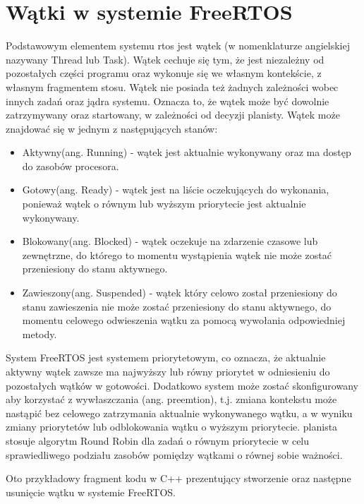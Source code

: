 \section{Wątki w systemie FreeRTOS}
Podstawowym elementem systemu \gls{rtos} jest wątek (w nomenklaturze angielskiej nazywany Thread lub Task).
Wątek cechuje się tym, że jest niezależny od pozostałych części programu oraz wykonuje się we własnym kontekście,
z własnym fragmentem stosu.
Wątek nie posiada też żadnych zależności wobec innych zadań oraz jądra systemu. Oznacza to, że wątek może być dowolnie
zatrzymywany oraz startowany, w zależności od decyzji planisty.
Wątek może znajdować się w jednym z następujących stanów:
\begin{itemize}
      \item Aktywny(ang. Running) - wątek jest aktualnie wykonywany oraz ma dostęp do zasobów procesora.
      \item Gotowy(ang. Ready) - wątek jest na liście oczekujących do wykonania, ponieważ wątek o równym lub wyższym
            priorytecie jest aktualnie wykonywany.
      \item Blokowany(ang. Blocked) - wątek oczekuje na zdarzenie czasowe lub zewnętrzne, do którego to momentu wystąpienia
            wątek nie może zostać przeniesiony do stanu aktywnego.
      \item Zawieszony(ang. Suspended) - wątek który celowo został przeniesiony do stanu zawieszenia nie może zostać przeniesiony
            do stanu aktywnego, do momentu celowego odwieszenia wątku za pomocą wywołania odpowiedniej metody.
\end{itemize}

System FreeRTOS jest systemem priorytetowym, co oznacza, że aktualnie aktywny wątek zawsze ma najwyższy lub równy priorytet
w odniesieniu do pozostałych wątków w gotowości. Dodatkowo system może zostać skonfigurowany
aby korzystać z wywłaszczania (ang. preemtion), t.j. zmiana kontekstu może nastąpić bez celowego zatrzymania aktualnie
wykonywanego wątku, a w wyniku zmiany priorytetów lub odblokowania wątku o wyższym priorytecie. \Gls{planista} stosuje algorytm
Round Robin dla zadań o równym priorytecie w celu sprawiedliwego podziału zasobów pomiędzy wątkami o równej sobie ważności.

Oto przykładowy fragment kodu w C++ prezentujący stworzenie oraz następne usunięcie wątku w systemie FreeRTOS.



